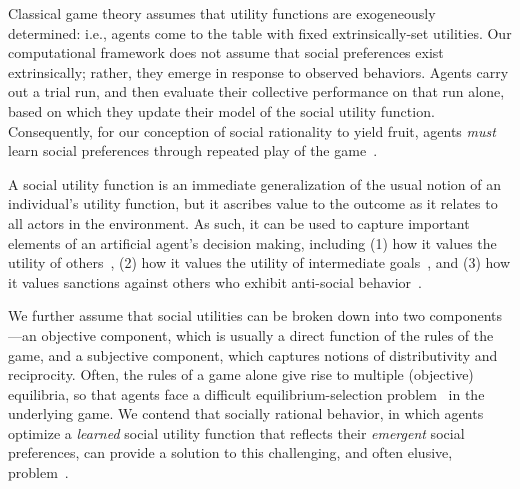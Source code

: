 Classical game theory assumes that utility functions are exogeneously
determined: i.e., agents come to the table with fixed
extrinsically-set utilities.
Our computational framework does not assume that social preferences
exist extrinsically; rather, they emerge in response to observed
behaviors.  Agents carry out a trial run, and then evaluate their
collective performance on that run alone, based on which they update
their model of the social utility function.
Consequently, for our conception of social rationality to yield fruit,
agents \emph{must\/} learn social preferences through repeated play of
the game~\cite{FL}.

A social utility function is an immediate generalization of the usual
notion of an individual's utility function, but it ascribes value to
the outcome as it relates to all actors in the environment.
%
%
As such, it can be used to capture important elements of an artificial
agent's decision making, including (1) how it values the utility of
others~\cite{littman01d}, (2) how it values the utility of intermediate goals~\cite{macglashan15b}, and (3)
how it values sanctions against others who exhibit anti-social behavior~\cite{macglashan14c}.

We further assume that social utilities can be broken down into two
components---an objective component, which is usually a direct
function of the rules of the game, and a subjective component, which
captures notions of distributivity and reciprocity.
%
Often, the rules of a game alone give rise to multiple
(objective) equilibria, so that agents face a difficult 
equilibrium-selection problem~\cite{} in the underlying game.  We contend that
socially rational behavior, in which agents optimize a
\emph{learned\/} social utility function that reflects their
\emph{emergent\/} social preferences, can provide a solution to this
challenging, and often elusive, problem~\cite{Binmore?}.

